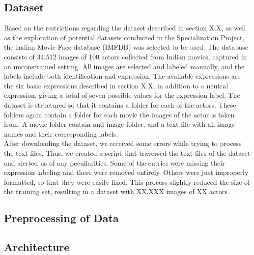 
\subsection{Dataset} %

Based on the restrictions regarding the dataset described in section X.X, as well as the exploration of potential datasets conducted in the Specialization Project, the Indian Movie Face database (IMFDB) was selected to be used. The database consists of 34,512 images of 100 actors collected from Indian movies, captured in an unconstrained setting. All images are selected and labeled manually, and the labels include both identification and expression. The available expressions are the six basic expressions described in section X.X, in addition to a neutral expression, giving a total of seven possible values for the expression label. The dataset is structured so that it contains a folder for each of the actors. These folders again contain a folder for each movie the images of the actor is taken from. A movie folder contain and image folder, and a text file with all image names and their corresponding labels. \\

\noindent After downloading the dataset, we received some errors while trying to process the text files. Thus, we created a script that traversed the text files of the dataset and alerted us of any peculiarities. Some of the entries were missing their expression labeling and these were removed entirely. Others were just improperly formatted, so that they were easily fixed. This process slightly reduced the size of the training set, resulting in a dataset with XX,XXX images of XX actors.


\subsection{Preprocessing of Data} %


\subsection{Architecture} %


